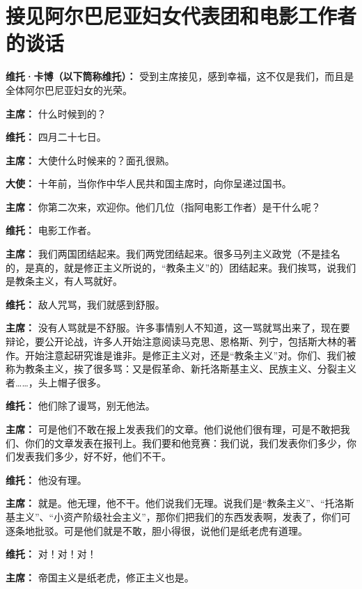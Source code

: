 \section[接见阿尔巴尼亚妇女代表团和电影工作者的谈话（一九六四年五月十五日）]{接见阿尔巴尼亚妇女代表团和电影工作者的谈话}

\begin{duihua}
\item[\textbf{维托·卡博（以下筒称维托）：}]{受到主席接见，感到幸福，这不仅是我们，而且是全体阿尔巴尼亚妇女的光荣。}
\item[\textbf{主席：}]{什么时候到的？} 
\item[\textbf{维托：}]{四月二十七日。}
\item[\textbf{主席：}]{大使什么时候来的？面孔很熟。}
\item[\textbf{大使：}]{十年前，当你作中华人民共和国主席时，向你呈递过国书。}
\item[\textbf{主席：}]{你第二次来，欢迎你。他们几位（指阿电影工作者）是干什么呢？}
\item[\textbf{维托：}]{电影工作者。}
\item[\textbf{主席：}]{我们两国团结起来。我们两党团结起来。很多马列主义政党（不是挂名的，是真的，就是修正主义所说的，“教条主义”的）团结起来。我们挨骂，说我们是教条主义，有人骂就好。}
\item[\textbf{维托：}]{敌人咒骂，我们就感到舒服。}
\item[\textbf{主席：}]没有人骂就是不舒服。许多事情别人不知道，这一骂就骂出来了，现在要辩论，要公开论战，许多人开始注意阅读马克思、恩格斯、列宁，包括斯大林的著作。开始注意起研究谁是谁非。是修正主义对，还是“教条主义”对。你们、我们被称为教条主义，挨了很多骂：{又是假革命、新托洛斯基主义、民族主义、分裂主义者……，头上帽子很多。}
\item[\textbf{维托：}]{他们除了谩骂，别无他法。}
\item[\textbf{主席：}]{可是他们不敢在报上发表我们的文章。他们说他们很有理，可是不敢把我们、你们的文章发表在报刊上。我们要和他竞赛：我们说，我们发表你们多少，你们发表我们多少，好不好，他们不干。}
\item[\textbf{维托：}]{他没有理。}
\item[\textbf{主席：}]{就是。他无理，他不干。他们说我们无理。说我们是“教条主义”、“托洛斯基主义”、“小资产阶级社会主义”，那你们把我们的东西发表啊，发表了，你们可逐条地批驳。可是他们就是不敢，胆小得很，说他们是纸老虎有道理。}
\item[\textbf{维托：}]{对！对！对！}
\item[\textbf{主席：}]{帝国主义是纸老虎，修正主义也是。}

\end{duihua}
